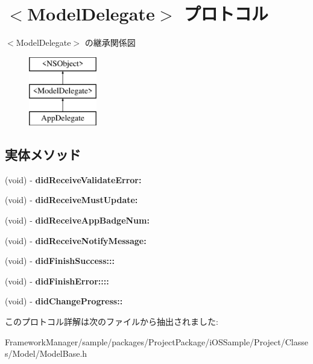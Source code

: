 \hypertarget{protocol_model_delegate-p}{}\section{$<$Model\+Delegate$>$ プロトコル}
\label{protocol_model_delegate-p}
$<$Model\+Delegate$>$ の継承関係図\begin{figure}[H]
\begin{center}
\leavevmode
\includegraphics[height=3.000000cm]{protocol_model_delegate-p}
\end{center}
\end{figure}
\subsection*{実体メソッド}
\begin{DoxyCompactItemize}
\item 
\hypertarget{protocol_model_delegate-p_a5acbae295fd008587fa7841674c258f3}{}(void) -\/ {\bfseries did\+Receive\+Validate\+Error\+:}\label{protocol_model_delegate-p_a5acbae295fd008587fa7841674c258f3}

\item 
\hypertarget{protocol_model_delegate-p_a82b8b13e223c98450ebf6b7cf83cc6e8}{}(void) -\/ {\bfseries did\+Receive\+Must\+Update\+:}\label{protocol_model_delegate-p_a82b8b13e223c98450ebf6b7cf83cc6e8}

\item 
\hypertarget{protocol_model_delegate-p_af62b780752528e635f97e1d232f53ce4}{}(void) -\/ {\bfseries did\+Receive\+App\+Badge\+Num\+:}\label{protocol_model_delegate-p_af62b780752528e635f97e1d232f53ce4}

\item 
\hypertarget{protocol_model_delegate-p_a2d7a92392459dd68f1b88a6119c1ca28}{}(void) -\/ {\bfseries did\+Receive\+Notify\+Message\+:}\label{protocol_model_delegate-p_a2d7a92392459dd68f1b88a6119c1ca28}

\item 
\hypertarget{protocol_model_delegate-p_ac2fa78311ae22702c01b6843ffe96b9b}{}(void) -\/ {\bfseries did\+Finish\+Success\+:::}\label{protocol_model_delegate-p_ac2fa78311ae22702c01b6843ffe96b9b}

\item 
\hypertarget{protocol_model_delegate-p_aca4404ae43b438719b4067ae71536bd3}{}(void) -\/ {\bfseries did\+Finish\+Error\+::::}\label{protocol_model_delegate-p_aca4404ae43b438719b4067ae71536bd3}

\item 
\hypertarget{protocol_model_delegate-p_a6a8c22bbc1767159d2b2ae24d576b589}{}(void) -\/ {\bfseries did\+Change\+Progress\+::}\label{protocol_model_delegate-p_a6a8c22bbc1767159d2b2ae24d576b589}

\end{DoxyCompactItemize}


このプロトコル詳解は次のファイルから抽出されました\+:\begin{DoxyCompactItemize}
\item 
Framework\+Manager/sample/packages/\+Project\+Package/i\+O\+S\+Sample/\+Project/\+Classes/\+Model/Model\+Base.\+h\end{DoxyCompactItemize}
